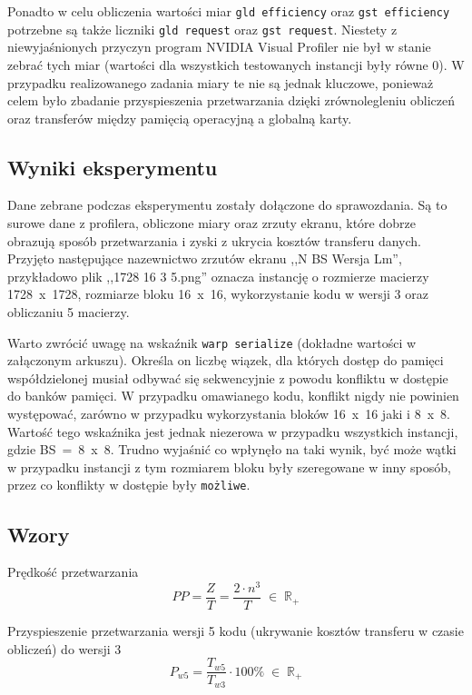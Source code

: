 \documentclass[12pt,a4paper]{article}
\begin{document}
Ponadto w celu obliczenia wartości miar \verb|gld efficiency| oraz \verb|gst efficiency| potrzebne są także liczniki  \verb|gld request| oraz  \verb|gst request|. Niestety z niewyjaśnionych przyczyn program NVIDIA Visual Profiler nie był w stanie zebrać tych  miar (wartości dla wszystkich testowanych instancji były równe 0). W przypadku realizowanego zadania miary te nie są jednak kluczowe, ponieważ celem było zbadanie przyspieszenia przetwarzania dzięki zrównolegleniu obliczeń oraz transferów między pamięcią operacyjną a globalną karty.


\subsection{Wyniki eksperymentu}

Dane zebrane podczas eksperymentu zostały dołączone do sprawozdania. Są to surowe dane z profilera, obliczone miary oraz zrzuty ekranu, które dobrze obrazują sposób przetwarzania i zyski z ukrycia kosztów transferu danych. Przyjęto następujące nazewnictwo zrzutów ekranu ,,N BS Wersja Lm'', przykładowo plik ,,1728 16 3 5.png'' oznacza instancję o rozmierze macierzy 1728~x~1728, rozmiarze bloku 16~x~16, wykorzystanie kodu w wersji 3 oraz obliczaniu 5 macierzy.

Warto zwrócić uwagę na wskaźnik \verb|warp serialize| (dokładne wartości w załączonym arkuszu). Określa on liczbę wiązek, dla których dostęp do pamięci współdzielonej musiał odbywać się sekwencyjnie z powodu konfliktu w dostępie do banków pamięci. W przypadku omawianego kodu, konflikt nigdy nie powinien występować, zarówno w przypadku wykorzystania bloków 16~x~16 jaki i 8~x~8. Wartość tego wskaźnika jest jednak niezerowa w przypadku wszystkich instancji, gdzie BS~=~8~x~8. Trudno wyjaśnić co wpłynęło na taki wynik, być może wątki w przypadku instancji z tym rozmiarem bloku były szeregowane w inny sposób, przez co konflikty w dostępie były \texttt{możliwe}.

\subsection{Wzory}

Prędkość przetwarzania
\begin{equation}
PP = \frac{Z}{T} = \frac{2 \cdot n^3}{T} \; \in \; \mathbb{R}_+
\end{equation}

Przyspieszenie przetwarzania wersji 5 kodu (ukrywanie kosztów transferu w czasie obliczeń) do wersji 3
\begin{equation}
P_{w5} = \frac{T_{w5}}{T_{w3}} \cdot 100\% \; \in \; \mathbb{R}_+
\end{equation}
\end{document}
